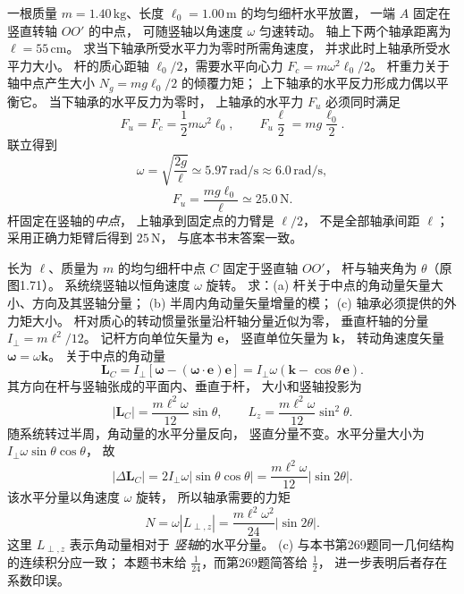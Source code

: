 
一根质量 $m=1.40\,\mathrm{kg}$、长度
$\ell_0=1.00\,\mathrm m$ 的均匀细杆水平放置，
一端 $A$ 固定在竖直转轴 $OO'$ 的中点，
可随竖轴以角速度 $\omega$ 匀速转动。
轴上下两个轴承距离为
$\ell=55\,\mathrm{cm}$。
求当下轴承所受水平力为零时所需角速度，
并求此时上轴承所受水平力大小。
\exsolution
杆的质心距轴 $\ell_0/2$，需要水平向心力
$F_c=m\omega^2\ell_0/2$。
杆重力关于轴中点产生大小
$N_g=mg\ell_0/2$ 的倾覆力矩；
上下轴承的水平反力形成力偶以平衡它。
当下轴承的水平反力为零时，
上轴承的水平力 $F_u$ 必须同时满足
\[
F_u=F_c=\frac12m\omega^2\ell_0,
\qquad
F_u\frac{\ell}{2}=mg\frac{\ell_0}{2}.
\]
联立得到
\[
\boxed{\omega=\sqrt{\frac{2g}{\ell}}
\simeq5.97\,\mathrm{rad/s}\approx6.0\,\mathrm{rad/s}},
\]
\[
\boxed{F_u=\frac{mg\ell_0}{\ell}
\simeq25.0\,\mathrm N}.
\]
\excheck 杆固定在竖轴的\emph{中点}，
上轴承到固定点的力臂是 $\ell/2$，
不是全部轴承间距 $\ell$；
采用正确力矩臂后得到 $25\,\mathrm N$，
与底本书末答案一致。

长为 $\ell$、质量为 $m$ 的均匀细杆中点 $C$
固定于竖直轴 $OO'$，
杆与轴夹角为 $\theta$（原图1.71）。
系统绕竖轴以恒角速度 $\omega$ 旋转。
求：(a) 杆关于中点的角动量矢量大小、方向及其竖轴分量；
(b) 半周内角动量矢量增量的模；
(c) 轴承必须提供的外力矩大小。
\exsolution
杆对质心的转动惯量张量沿杆轴分量近似为零，
垂直杆轴的分量
$I_\perp=m\ell^2/12$。
记杆方向单位矢量为 $\bm e$，
竖直单位矢量为 $\bm k$，
转动角速度矢量 $\bm\omega=\omega\bm k$。
关于中点的角动量
\[
\bm L_C=I_\perp[
\bm\omega-(\bm\omega\cdot\bm e)\bm e]
=I_\perp\omega(\bm k-\cos\theta\,\bm e).
\]
其方向在杆与竖轴张成的平面内、垂直于杆，
大小和竖轴投影为
\[
\boxed{|\bm L_C|=\frac{m\ell^2\omega}{12}\sin\theta},
\qquad
\boxed{L_z=\frac{m\ell^2\omega}{12}\sin^2\theta}.
\]
随系统转过半周，角动量的水平分量反向，
竖直分量不变。水平分量大小为
$I_\perp\omega\sin\theta\cos\theta$，
故
\[
\boxed{|\Delta\bm L_C|
=2I_\perp\omega|\sin\theta\cos\theta|
=\frac{m\ell^2\omega}{12}|\sin2\theta|}.
\]
该水平分量以角速度 $\omega$ 旋转，
所以轴承需要的力矩
\[
\boxed{N=\omega|L_{\perp,z}|
=\frac{m\ell^2\omega^2}{24}|\sin2\theta|}.
\]
\excheck 这里 $L_{\perp,z}$ 表示角动量相对于
\emph{竖轴}的水平分量。
(c) 与本书第269题同一几何结构的连续积分应一致；
本题书末给 $\frac1{24}$，而第269题简答给 $\frac12$，
进一步表明后者存在系数印误。

